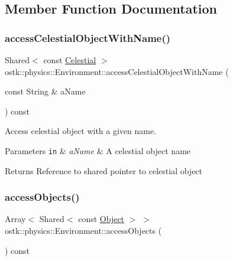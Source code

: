 \subsection{Member Function Documentation}
\mbox{\label{classostk_1_1physics_1_1_environment_a3430014a088dfa3cb52840431d0e0fe8}} 
\subsubsection{\texorpdfstring{access\+Celestial\+Object\+With\+Name()}{accessCelestialObjectWithName()}}
{\footnotesize\ttfamily Shared$<$ const \hyperlink{classostk_1_1physics_1_1env_1_1obj_1_1_celestial}{Celestial} $>$ ostk\+::physics\+::\+Environment\+::access\+Celestial\+Object\+With\+Name (\begin{DoxyParamCaption}\item[{const String \&}]{a\+Name }\end{DoxyParamCaption}) const}



Access celestial object with a given name. 


\begin{DoxyParams}[1]{Parameters}
\mbox{\tt in}  & {\em a\+Name} & A celestial object name \\
\hline
\end{DoxyParams}
\begin{DoxyReturn}{Returns}
Reference to shared pointer to celestial object 
\end{DoxyReturn}
\mbox{\label{classostk_1_1physics_1_1_environment_a1dde23abaa5abd815eef4d4fbd5355ed}} 
\subsubsection{\texorpdfstring{access\+Objects()}{accessObjects()}}
{\footnotesize\ttfamily Array$<$ Shared$<$ const \hyperlink{classostk_1_1physics_1_1env_1_1_object}{Object} $>$ $>$ ostk\+::physics\+::\+Environment\+::access\+Objects (\begin{DoxyParamCaption}{ }\end{DoxyParamCaption}) const}



